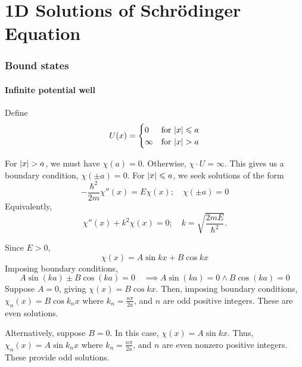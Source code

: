 \documentclass[a4paper,11pt]{article}
\begin{document}
\part{1D Solutions of Schr\"odinger Equation}
\section{Bound states}
\subsection{Infinite potential well}
\begin{example}
    Define
\[
	U(x) = \begin{cases}
		0      & \text{for } \abs{x} \leqslant a \\
		\infty & \text{for } \abs{x} > a
	\end{cases}
\]

\begin{center}
\end{center}

For \( \abs{x} > a \), we must have \( \chi(a) = 0 \).
Otherwise, \( \chi \cdot U = \infty \).
This gives us a boundary condition, \( \chi(\pm a) = 0 \).
For \( \abs{x} \leqslant a \), we seek solutions of the form
\[
	-\frac{\hbar^2}{2m} \chi''(x) = E \chi(x);\quad \chi(\pm a) = 0
\]
Equivalently,
\[
	\chi''(x) + k^2 \chi(x) = 0;\quad k = \sqrt{\frac{2mE}{\hbar^2}}. 
\]
\end{example}
Since \( E > 0 \),
\[
	\chi(x) = A \sin kx + B \cos kx
\]
Imposing boundary conditions,
\[
	A \sin (k a) \pm B \cos (k a)=0 \quad \implies A \sin (k a)=0 \wedge B \cos (k a)=0
\]
Suppose \( A = 0 \), giving \( \chi(x) = B \cos kx \).
Then, imposing boundary conditions, \( \chi_n(x) = B \cos k_n x \) where \( k_n = \frac{n \pi}{2a} \), and \( n \) are odd positive integers.
These are even solutions.

Alternatively, suppose \( B = 0 \).
In this case, \( \chi(x) = A \sin kx \).
Thus, \( \chi_n(x) = A \sin k_n x \) where \( k_n = \frac{n \pi}{2a} \), and \( n \) are even nonzero positive integers.
These provide odd solutions.
\end{document}
